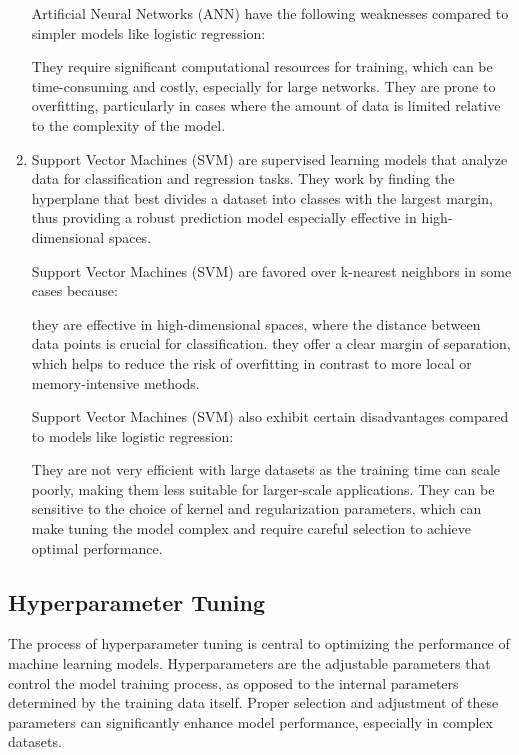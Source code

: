 \begin{enumerate}
          Artificial Neural Networks (ANN) have the following weaknesses compared to simpler models like logistic regression:

          They require significant computational resources for training, which can be time-consuming and costly, especially for large networks.
          They are prone to overfitting, particularly in cases where the amount of data is limited relative to the complexity of the model.



    \item Support Vector Machines (SVM) are supervised learning models that analyze data for classification and regression tasks. They work by finding the hyperplane that best divides a dataset into classes with the largest margin, thus providing a robust prediction model especially effective in high-dimensional spaces.


          Support Vector Machines (SVM) are favored over k-nearest neighbors in some cases because:

          they are effective in high-dimensional spaces, where the distance between data points is crucial for classification.
          they offer a clear margin of separation, which helps to reduce the risk of overfitting in contrast to more local or memory-intensive methods.


          Support Vector Machines (SVM) also exhibit certain disadvantages compared to models like logistic regression:

          They are not very efficient with large datasets as the training time can scale poorly, making them less suitable for larger-scale applications.
          They can be sensitive to the choice of kernel and regularization parameters, which can make tuning the model complex and require careful selection to achieve optimal performance.

\end{enumerate}

\subsection{Hyperparameter Tuning}

\hfill

The process of hyperparameter tuning is central to optimizing the performance of machine learning models. Hyperparameters are the adjustable parameters that control the model training process, as opposed to the internal parameters determined by the training data itself. Proper selection and adjustment of these parameters can significantly enhance model performance, especially in complex datasets.

